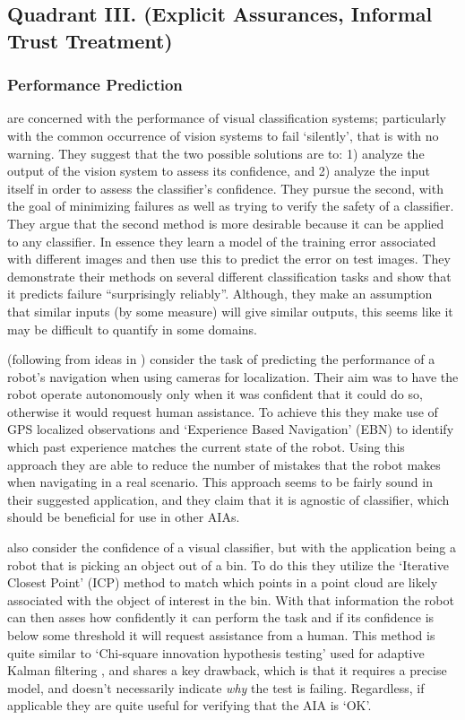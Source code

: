 \subsection{Quadrant III. (Explicit Assurances, Informal Trust Treatment)}\label{sec:q3}
\subsubsection{Performance Prediction} \label{sec:performance_prediction}
    \citet{Zhang2014-he} are concerned with the performance of visual classification systems; particularly with the common occurrence of vision systems to fail `silently', that is with no warning. They suggest that the two possible solutions are to: 1) analyze the output of the vision system to assess its confidence, and 2) analyze the input itself in order to assess the classifier's confidence. They pursue the second, with the goal of minimizing failures as well as trying to verify the safety of a classifier. They argue that the second method is more desirable because it can be applied to any classifier. In essence they learn a model of the training error associated with different images and then use this to predict the error on test images. They demonstrate their methods on several different classification tasks and show that it predicts failure ``surprisingly reliably''. Although, they make an assumption that similar inputs (by some measure) will give similar outputs, this seems like it may be difficult to quantify in some domains.

    \citet{Gurau2016-hs} (following from ideas in \citet{Churchill2015-ei}) consider the task of predicting the performance of a robot's navigation when using cameras for localization. Their aim was to have the robot operate autonomously only when it was confident that it could do so, otherwise it would request human assistance. To achieve this they make use of GPS localized observations and `Experience Based Navigation' (EBN) to identify which past experience matches the current state of the robot. Using this approach they are able to reduce the number of mistakes that the robot makes when navigating in a real scenario. This approach seems to be fairly sound in their suggested application, and they claim that it is agnostic of classifier, which should be beneficial for use in other AIAs.

    \citet{Kaipa2015-hy} also consider the confidence of a visual classifier, but with the application being a robot that is picking an object out of a bin. To do this they utilize the `Iterative Closest Point' (ICP) method to match which points in a point cloud are likely associated with the object of interest in the bin. With that information the robot can then asses how confidently it can perform the task and if its confidence is below some threshold it will request assistance from a human. This method is quite similar to `Chi-square innovation hypothesis testing' used for adaptive Kalman filtering \cite{Bar-Shalom2001-tg}, and shares a key drawback, which is that it requires a precise model, and doesn't necessarily indicate \emph{why} the test is failing. Regardless, if applicable they are quite useful for verifying that the AIA is `OK'.

